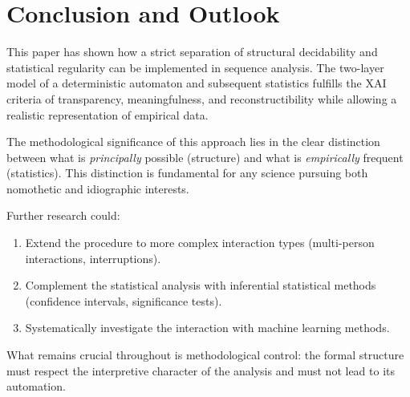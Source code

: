 \documentclass[
  12pt,
  a4paper,
  oneside,
  titlepage
]{article}
\begin{document}
\section{Conclusion and Outlook}

This paper has shown how a strict separation of structural decidability and 
statistical regularity can be implemented in sequence analysis. The two-layer 
model of a deterministic automaton and subsequent statistics fulfills the XAI 
criteria of transparency, meaningfulness, and reconstructibility while allowing 
a realistic representation of empirical data.

The methodological significance of this approach lies in the clear distinction 
between what is \textit{principally} possible (structure) and what is 
\textit{empirically} frequent (statistics). This distinction is fundamental for 
any science pursuing both nomothetic and idiographic interests.

Further research could:

\begin{enumerate}
    \item Extend the procedure to more complex interaction types 
    (multi-person interactions, interruptions).
    
    \item Complement the statistical analysis with inferential statistical 
    methods (confidence intervals, significance tests).
    
    \item Systematically investigate the interaction with machine learning 
    methods.
\end{enumerate}

What remains crucial throughout is methodological control: the formal structure 
must respect the interpretive character of the analysis and must not lead to 
its automation.
\end{document}
